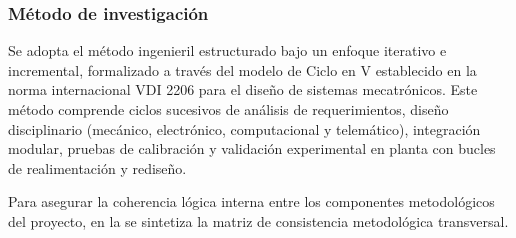 \subsubsection{Método de investigación}
\label{subsubsec:metodo_investigacion}

Se adopta el método ingenieril estructurado bajo un enfoque iterativo e incremental, formalizado a través del modelo de Ciclo en V establecido en la norma internacional VDI 2206 para el diseño de sistemas mecatrónicos. Este método comprende ciclos sucesivos de análisis de requerimientos, diseño disciplinario (mecánico, electrónico, computacional y telemático), integración modular, pruebas de calibración y validación experimental en planta con bucles de realimentación y rediseño.

Para asegurar la coherencia lógica interna entre los componentes metodológicos del proyecto, en la  se sintetiza la matriz de consistencia metodológica transversal.

